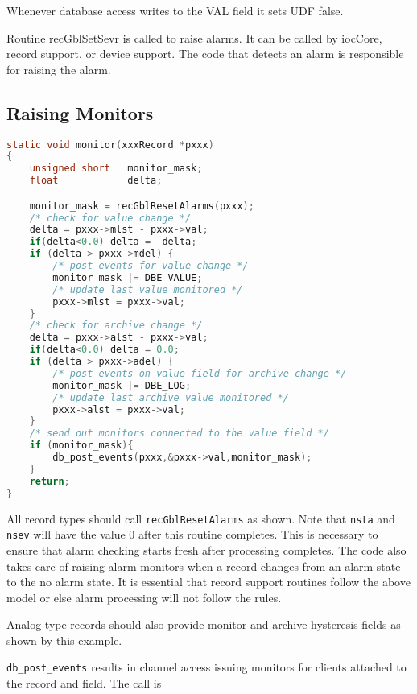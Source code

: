 Whenever database access writes to the VAL field it sets UDF false.

Routine recGblSetSevr is called to raise alarms.
It can be called by iocCore, record support, or device support.
The code that detects an alarm is responsible for raising the alarm.

\subsection{Raising Monitors}

\begin{lstlisting}[language=C]
static void monitor(xxxRecord *pxxx)
{
    unsigned short   monitor_mask;
    float            delta;

    monitor_mask = recGblResetAlarms(pxxx);
    /* check for value change */
    delta = pxxx->mlst - pxxx->val;
    if(delta<0.0) delta = -delta;
    if (delta > pxxx->mdel) {
        /* post events for value change */
        monitor_mask |= DBE_VALUE;
        /* update last value monitored */
        pxxx->mlst = pxxx->val;
    }
    /* check for archive change */
    delta = pxxx->alst - pxxx->val;
    if(delta<0.0) delta = 0.0;
    if (delta > pxxx->adel) {
        /* post events on value field for archive change */
        monitor_mask |= DBE_LOG;
        /* update last archive value monitored */
        pxxx->alst = pxxx->val;
    }
    /* send out monitors connected to the value field */
    if (monitor_mask){
        db_post_events(pxxx,&pxxx->val,monitor_mask);
    }
    return;
}
\end{lstlisting}

All record types should call \verb|recGblResetAlarms| as shown.
Note that \verb|nsta| and \verb|nsev| will have the value 0 after this routine completes.
This is necessary to ensure that alarm checking starts fresh after processing completes.
The code also takes care of raising alarm monitors when a record changes from an alarm state to the no alarm state.
It is essential that record support routines follow the above model or else alarm processing will not follow the rules.

Analog type records should also provide monitor and archive hysteresis fields as shown by this example.

\verb|db_post_events| results in channel access issuing monitors for clients attached to the record and field.
The call is

